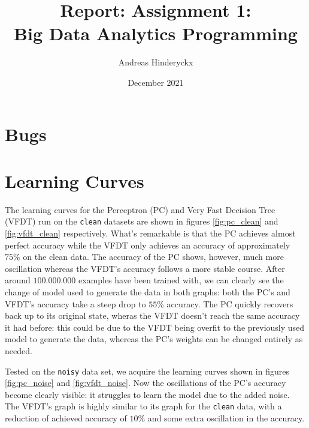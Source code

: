 \documentclass[12pt]{article}
\title{Report: Assignment 1: \\Big Data Analytics Programming}
\author{Andreas Hinderyckx}
\date{December 2021}
\begin{document}
\newcommand{\todo}{\fbox{\textbf{\textcolor{red}{TODO}}} }
\newcommand{\sctf}[1]{10\mathrm{e}{-#1}}
\maketitle

\newpage

\section{Bugs}
\section{Learning Curves}
The learning curves for the Perceptron (PC) and Very Fast Decision Tree (VFDT) run on the \texttt{clean} datasets are shown in figures \ref{fig:pc_clean} and \ref{fig:vfdt_clean} respectively. What's remarkable is that the PC achieves almost perfect accuracy while the VFDT only achieves an accuracy of approximately $75\%$ on the clean data. The accuracy of the PC shows, however, much more oscillation whereas the VFDT's accuracy follows a more stable course. After around $100.000.000$ examples have been trained with, we can clearly see the change of model used to generate the data in both graphs: both the PC's and VFDT's accuracy take a steep drop to $55\%$ accuracy. The PC quickly recovers back up to its original state, wheras the VFDT doesn't reach the same accuracy it had before: this could be due to the VFDT being overfit to the previously used model to generate the data, whereas the PC's weights can be changed entirely as needed.	

Tested on the \texttt{noisy} data set, we acquire the learning curves shown in figures \ref{fig:pc_noise} and \ref{fig:vfdt_noise}. Now the oscillations of the PC's accuracy become clearly visible: it struggles to learn the model due to the added noise. The VFDT's graph is highly similar to its graph for the \texttt{clean} data, with a reduction of achieved accuracy of $10\%$ and some extra oscillation in the accuracy.
\end{document}

